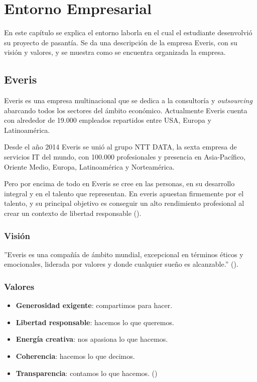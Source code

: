 \chapter{Entorno Empresarial}
\label{capitulo1}

En este capítulo se explica el entorno laborla en el cual el
estudiante desenvolvió su proyecto de pasantía. Se da una descripción
de la empresa Everis, con su visión y valores, y se muestra
como se encuentra organizada la empresa.


\section{Everis}

Everis es una empresa multinacional que se dedica a la consultoría y
\emph{outsourcing} abarcando todos los sectores del ámbito económico.
Actualmente Everis cuenta con alrededor de 19.000
empleados repartidos entre USA, Europa y Latinoamérica.

Desde el año 2014 Everis se unió al grupo NTT DATA, la sexta empresa de
servicios IT del mundo, con 100.000 profesionales y presencia en Asia-Pacífico,
Oriente Medio, Europa, Latinoamérica y Norteamérica.

Pero por encima de todo en Everis se cree en las personas, en su desarrollo integral y en
el talento que representan. En everis apuestan firmemente por el talento, y
su principal objetivo es conseguir un alto rendimiento profesional al crear
un contexto de libertad responsable (\cite{EVERIS}).

\subsection{Visión}

''Everis es una compañía de ámbito mundial, excepcional en términos éticos y
emocionales, liderada por valores y donde cualquier sueño es alcanzable.'' (\cite{EVERIS}).

\subsection{Valores}

\begin{itemize}
  \item \textbf{Generosidad exigente}: compartimos para hacer.
  \item \textbf{Libertad responsable}: hacemos lo que queremos.
  \item \textbf{Energía creativa}: nos apasiona lo que hacemos.
  \item \textbf{Coherencia}: hacemos lo que decimos.
  \item \textbf{Transparencia}: contamos lo que hacemos. (\cite{EVERIS})
\end{itemize}






